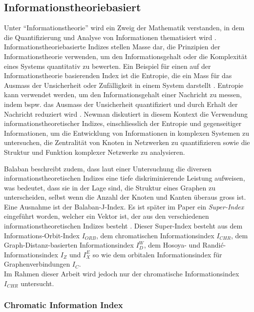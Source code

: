\subsection{Informationstheoriebasiert}

Unter \enquote{Informationstheorie} wird ein Zweig der Mathematik verstanden, in dem die Quantifizierung und Analyse von Informationen thematisiert wird \cite[p.~82-83]{dehmer_information_2008}.
Informationstheoriebasierte Indizes stellen Masse dar, die Prinzipien der Informationstheorie verwenden, um den Informationsgehalt oder die Komplexität eines Systems quantitativ zu bewerten.
Ein Beispiel für einen auf der Informationstheorie basierenden Index ist die Entropie, die ein Mass für das Ausmass der Unsicherheit oder Zufälligkeit in einem System darstellt \cite[p.~767-768]{dehmer_information_2011}.
Entropie kann verwendet werden, um den Informationsgehalt einer Nachricht zu messen, indem bspw. das Ausmass der Unsicherheit quantifiziert und durch Erhalt der Nachricht reduziert wird \cite[p.~3]{iceland_multigroup_2004}.
Newman \cite[p.~2ff]{newman_structure_2003} diskutiert in diesem Kontext die Verwendung informationstheoretischer Indizes, einschliesslich der Entropie und gegenseitiger Informationen, um die Entwicklung von Informationen in komplexen Systemen zu untersuchen, die Zentralität von Knoten in Netzwerken zu quantifizieren sowie die Struktur und Funktion komplexer Netzwerke zu analysieren.

Balaban \cite[p.~16]{balaban_1983_2014} beschreibt zudem, dass laut einer Untersuchung die diversen informationstheoretischen Indizes eine tiefe diskriminierende Leistung aufweisen, was bedeutet, dass sie in der Lage sind, die Struktur eines Graphen zu unterscheiden, selbst wenn die Anzahl der Knoten und Kanten überaus gross ist. Eine Ausnahme ist der Balaban-J-Index.
Es ist später im Paper ein \emph{Super-Index} eingeführt worden, welcher ein Vektor ist, der aus den verschiedenen informationstheoretischen Indizes besteht \cite[p.~16]{balaban_1983_2014}. Dieser Super-Index besteht aus dem Informations-Orbit-Index $ I_{ORB}$, dem chromatischen Informationsindex $ I_{CHR} $, dem Graph-Distanz-basierten Informationsindex $ I^W_D $, dem Hosoya- und Randić-Informationsindex $ I_Z $ und $ I^E_X $ so wie dem orbitalen Informationsindex für Graphenverbindungen $ I_C $. \\
Im Rahmen dieser Arbeit wird jedoch nur der chromatische Informationsindex $ I_{CHR} $ untersucht.

\subsubsection{Chromatic Information Index}

